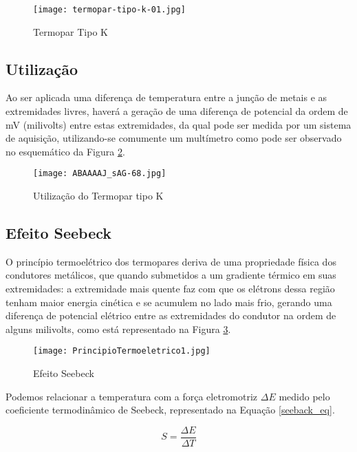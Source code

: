 \documentclass[a4paper,12pt]{article}
\begin{document}
\begin{figure}[htbp]
    \centering
    \texttt{[image: termopar-tipo-k-01.jpg]}
    \caption{Termopar Tipo K}
    \label{real}
\end{figure}

\subsection{Utilização}
Ao ser aplicada uma diferença de temperatura entre a junção de metais e as extremidades livres, haverá a geração de uma diferença de potencial da ordem de mV (milivolts) entre estas extremidades, da qual pode ser medida por um sistema de aquisição, utilizando-se comumente um multímetro como pode ser observado no esquemático da Figura \ref{esquematico}.

\hfill \break
\hfill \break

\begin{figure}[htbp]
    \centering
    \texttt{[image: ABAAAAJ\_sAG-68.jpg]}
    \caption{Utilização do Termopar tipo K}
    \label{esquematico}
\end{figure}

\pagebreak

\subsection{Efeito Seebeck}

O princípio termoelétrico dos termopares deriva de uma propriedade física dos condutores metálicos, que quando  submetidos a um gradiente térmico em suas extremidades: a extremidade mais quente faz com que os elétrons dessa região tenham maior energia cinética e se acumulem no lado mais frio, gerando uma diferença de potencial elétrico entre as extremidades do condutor na ordem de alguns milivolts, como está representado na Figura \ref{seebeck}.

\begin{figure}[htbp]
    \centering
    \texttt{[image: PrincipioTermoeletrico1.jpg]}
    \caption{Efeito Seebeck}
    \label{seebeck}
\end{figure}

\noindent Podemos relacionar a temperatura com a força eletromotriz $\Delta E$ medido pelo coeficiente termodinâmico de Seebeck, representado na Equação \ref{seeback_eq}.

\begin{equation}
    S = \frac{\Delta E}{\Delta T}
    \label{seeback_eq}
\end{equation}  
\end{document}
